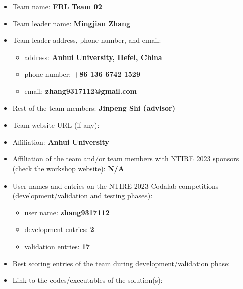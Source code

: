 \documentclass[10pt,twocolumn,letterpaper]{article}
\begin{document}
\begin{itemize}
	\item Team name: \textbf{FRL Team 02}                                  
	\item Team leader name: \textbf{Mingjian Zhang }                          
	\item Team leader address, phone number, and email:
	\begin{itemize}
		\item address: \textbf{Anhui University, Hefei, China}
		\item phone number: \textbf{+86 136 6742 1529}
		\item email: \textbf{zhang9317112@gmail.com}
	\end{itemize}
	\item Rest of the team members: \textbf{Jinpeng Shi (advisor)}        
	\item Team website URL (if any): \\                    
	\item Affiliation: \textbf{Anhui University}
	\item Affiliation of the team and/or team members with NTIRE 2023 sponsors (check the workshop website): \textbf{N/A}
	\item User names and entries on the NTIRE 2023 Codalab competitions (development/validation and testing phases):
	\begin{itemize}
		\item user name: \textbf{zhang9317112}
		\item development entries: \textbf{2}
		\item validation entries: \textbf{17}
	\end{itemize}
	\item Best scoring entries of the team during development/validation phase:
	\begin{table}[h]
		\centering
	\end{table}
	\item Link to the codes/executables of the solution(s): \\ 
\end{itemize}
\end{document}
